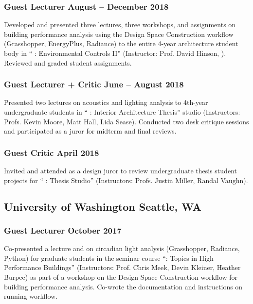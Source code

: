 \documentclass[letterpaper, oneside, 10pt]{article}
\begin{document}
\subsubsection*{Guest Lecturer\DotSep{0.25em} August -- December 2018}

Developed and presented three lectures, three workshops, and assignments on
building performance analysis using the Design Space Construction workflow
(Grasshopper, EnergyPlus, Radiance) to the entire 4-year architecture
student body in `` : Environmental Controls II'' (Instructor:
Prof. David Hinson, ). Reviewed and graded student assignments.


\subsubsection*{Guest Lecturer + Critic\DotSep{0.25em} June – August 2018}

Presented two lectures on acoustics and lighting analysis to 4th-year
undergraduate students in `` : Interior Architecture
Thesis'' studio (Instructors: Profs. Kevin Moore, Matt Hall, Lida Sease).
Conducted two desk critique sessions and participated as a juror for midterm
and final reviews.


\subsubsection*{Guest Critic\DotSep{0.25em} April 2018}

Invited and attended as a design juror to review undergraduate thesis student
projects for `` : Thesis Studio'' (Instructors: Profs. Justin
Miller, Randal Vaughn).

\subsection*{University of Washington\DotSep{0.25em} Seattle, WA}

\subsubsection*{Guest Lecturer\DotSep{0.25em} October 2017}

Co-presented a lecture and on circadian light analysis (Grasshopper, Radiance,
Python) for graduate students in the seminar course ``:
Topics in High Performance Buildings'' (Instructors: Prof. Chris Meek, Devin
Kleiner, Heather Burpee) as part of a workshop on the Design Space
Construction  workflow for building performance analysis. Co-wrote
the documentation and instructions on running  workflow.
\end{document}
